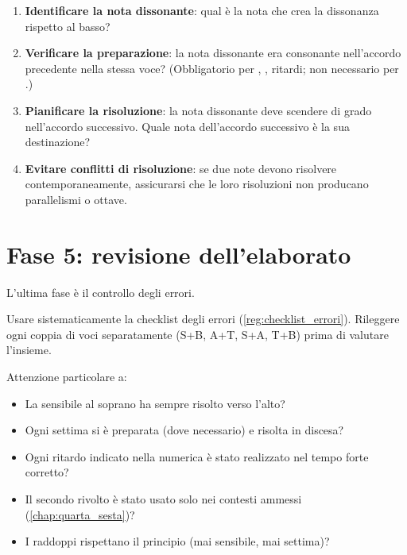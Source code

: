 \begin{regola}
	\label{reg:dissonanze_realizzazione}
	\begin{enumerate}
		\item \textbf{Identificare la nota dissonante}: qual è la nota che crea la dissonanza rispetto al basso?
		\item \textbf{Verificare la preparazione}: la nota dissonante era consonante nell'accordo precedente nella stessa voce? (Obbligatorio per , , ritardi; non necessario per .)
		\item \textbf{Pianificare la risoluzione}: la nota dissonante deve scendere di grado nell'accordo successivo. Quale nota dell'accordo successivo è la sua destinazione?
		\item \textbf{Evitare conflitti di risoluzione}: se due note devono risolvere contemporaneamente, assicurarsi che le loro risoluzioni non producano parallelismi o ottave.
	\end{enumerate}
\end{regola}

\section{Fase 5: revisione dell'elaborato}
\label{sec:fase5_numerato}

L'ultima fase è il controllo degli errori.

\begin{regola}
	\label{reg:revisione_numerato}
	Usare sistematicamente la checklist degli errori (\ref{reg:checklist_errori}). Rileggere ogni coppia di voci separatamente (S+B, A+T, S+A, T+B) prima di valutare l'insieme.
	
	Attenzione particolare a:
	\begin{itemize}
		\item La sensibile al soprano ha sempre risolto verso l'alto?
		\item Ogni settima si è preparata (dove necessario) e risolta in discesa?
		\item Ogni ritardo indicato nella numerica è stato realizzato nel tempo forte corretto?
		\item Il secondo rivolto è stato usato solo nei contesti ammessi (\ref{chap:quarta_sesta})?
		\item I raddoppi rispettano il principio (mai sensibile, mai settima)?
	\end{itemize}
\end{regola}

